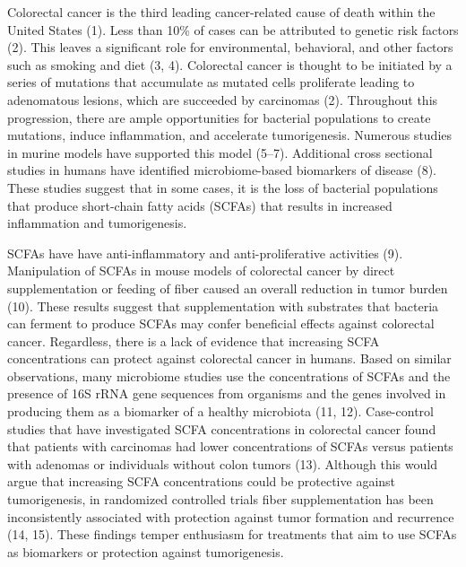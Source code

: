 \documentclass[11pt,]{article}
\begin{document}
\newpage

Colorectal cancer is the third leading cancer-related cause of death
within the United States (1). Less than 10\% of cases can be attributed
to genetic risk factors (2). This leaves a significant role for
environmental, behavioral, and other factors such as smoking and diet
(3, 4). Colorectal cancer is thought to be initiated by a series of
mutations that accumulate as mutated cells proliferate leading to
adenomatous lesions, which are succeeded by carcinomas (2). Throughout
this progression, there are ample opportunities for bacterial
populations to create mutations, induce inflammation, and accelerate
tumorigenesis. Numerous studies in murine models have supported this
model (5--7). Additional cross sectional studies in humans have
identified microbiome-based biomarkers of disease (8). These studies
suggest that in some cases, it is the loss of bacterial populations that
produce short-chain fatty acids (SCFAs) that results in increased
inflammation and tumorigenesis.

SCFAs have have anti-inflammatory and anti-proliferative activities (9).
Manipulation of SCFAs in mouse models of colorectal cancer by direct
supplementation or feeding of fiber caused an overall reduction in tumor
burden (10). These results suggest that supplementation with substrates
that bacteria can ferment to produce SCFAs may confer beneficial effects
against colorectal cancer. Regardless, there is a lack of evidence that
increasing SCFA concentrations can protect against colorectal cancer in
humans. Based on similar observations, many microbiome studies use the
concentrations of SCFAs and the presence of 16S rRNA gene sequences from
organisms and the genes involved in producing them as a biomarker of a
healthy microbiota (11, 12). Case-control studies that have investigated
SCFA concentrations in colorectal cancer found that patients with
carcinomas had lower concentrations of SCFAs versus patients with
adenomas or individuals without colon tumors (13). Although this would
argue that increasing SCFA concentrations could be protective against
tumorigenesis, in randomized controlled trials fiber supplementation has
been inconsistently associated with protection against tumor formation
and recurrence (14, 15). These findings temper enthusiasm for treatments
that aim to use SCFAs as biomarkers or protection against tumorigenesis.
\end{document}
